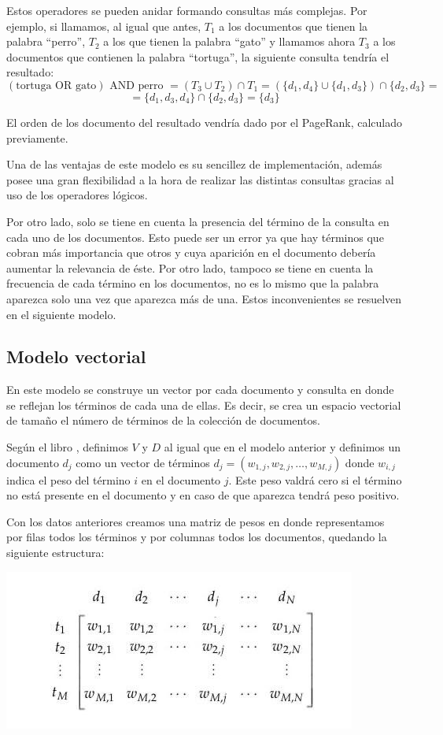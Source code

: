 \documentclass[size=a4, parskip=half, titlepage=false, toc=flat, toc=bib, 12pt]{scrartcl}
\theoremstyle{theorem-style}
\theoremstyle{definition-style}
\theoremstyle{remark-style}
\theoremstyle{example-style}
\theoremstyle{definition-style}
\theoremstyle{remark-style}
\begin{document}
Estos operadores se pueden anidar formando consultas más complejas. Por ejemplo, si llamamos, al igual que antes, $T_1$ a los documentos que tienen la palabra ``perro'', $T_2$ a los que tienen la palabra ``gato'' y llamamos ahora $T_3$ a los documentos que contienen la palabra ``tortuga'', la siguiente consulta tendría el resultado:
$$(\textrm{tortuga OR gato}) \textrm{ AND perro } = (T_3 \cup T_2) \cap T_1 = (\{d_1, d_4\} \cup \{d_1, d_3\}) \cap \{d_2, d_3\} =$$ $$= \{d_1, d_3, d_4\} \cap \{d_2 , d_3\} = \{d_3\} $$

El orden de los documento del resultado vendría dado por el PageRank, calculado previamente.

Una de las ventajas de este modelo es su sencillez de implementación, además posee una gran flexibilidad a la hora de realizar las distintas consultas gracias al uso de los operadores lógicos.

Por otro lado, solo se tiene en cuenta la presencia del término de la consulta en cada uno de los documentos. Esto puede ser un error ya que hay términos que cobran más importancia que otros y cuya aparición en el documento debería aumentar la relevancia de éste. Por otro lado, tampoco se tiene en cuenta la frecuencia de cada término en los documentos, no es lo mismo que la palabra aparezca solo una vez que aparezca más de una. Estos inconvenientes se resuelven en el siguiente modelo.

\subsection{Modelo vectorial}
En este modelo se construye un vector por cada documento y consulta en donde se reflejan los términos de cada una de ellas. Es decir, se crea un espacio vectorial de tamaño el número de términos de la colección de documentos.

Según el libro \cite{ri}, definimos $V$ y $D$ al igual que en el modelo anterior y definimos un documento $d_j$ como un vector de términos $d_j = (w_{1,j}, w_{2,j}, \dots, w_{M,j})$ donde $w_{i,j}$ indica el peso del término $i$ en el documento $j$. Este peso valdrá cero si el término no está presente en el documento y en caso de que aparezca tendrá peso positivo.

Con los datos anteriores creamos una matriz de pesos en donde representamos por filas todos los términos y por columnas todos los documentos, quedando la siguiente estructura:

\begin{center}
\includegraphics[scale=0.6]{./img/matrizpesos}
\end{center}
\end{document}
